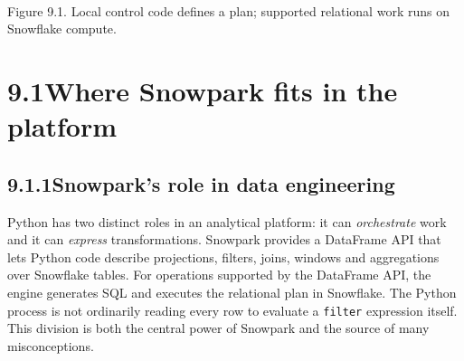 \documentclass[11pt,twoside]{article}
\newcommand{\topic}[2]{\subsection*{#1\quad #2}}
\begin{document}
\begin{center}\\{\fontsize{8}{9.5}\selectfont\color{inkgray}Figure 9.1. Local control code defines a plan; supported relational work runs on Snowflake compute.}\end{center}
\newpage
\section*{9.1\quad Where Snowpark fits in the platform}
\topic{9.1.1}{Snowpark's role in data engineering}
Python has two distinct roles in an analytical platform: it can \emph{orchestrate} work and it can \emph{express} transformations. Snowpark provides a DataFrame API that lets Python code describe projections, filters, joins, windows and aggregations over Snowflake tables. For operations supported by the DataFrame API, the engine generates SQL and executes the relational plan in Snowflake. The Python process is not ordinarily reading every row to evaluate a \texttt{filter} expression itself. This division is both the central power of Snowpark and the source of many misconceptions.
\end{document}
